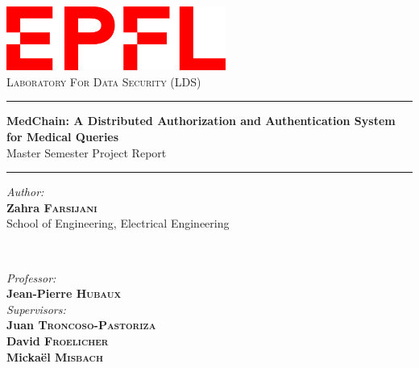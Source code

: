 \documentclass[12pt]{article}
\begin{document}
\begin{titlepage}
\center
\includegraphics[width=7.2cm]{Images/EPFL_Logo_SVG.png}\vspace{23pt}\\
\textsc{\Large Laboratory For Data Security (LDS)}\\[0.5cm]

\vspace{25pt}
\hrule
\vspace{0.4cm}
{\Large \bfseries MedChain: A Distributed Authorization and Authentication System for Medical Queries }\\[0.5cm] %
\normalsize{Master Semester Project Report}
\vspace{0.4cm}
\hrule 
\vspace{1.5cm}
\begin{minipage}{0.5\textwidth}\large
\begin{flushleft}
\emph{Author:}\\
\textbf{Zahra \textsc{Farsijani}}\\
School of Engineering, Electrical Engineering
\end{flushleft}
\end{minipage}
~
\begin{minipage}{0.4\textwidth}
\begin{flushright} \large
\emph{Professor:} \\
\textbf{Jean-Pierre \textsc{Hubaux}}\\
\emph{Supervisors:} \\
\textbf{Juan \textsc{Troncoso-Pastoriza} }\\
\textbf{David \textsc{Froelicher}}\\
\textbf{Mickaël \textsc{Misbach}}


\end{flushright}
\end{minipage}
\end{titlepage}
\end{document}
